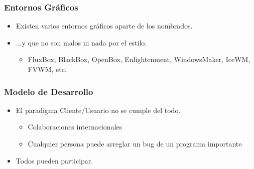 \frame
{
\frametitle{Entornos Gráficos}
\begin{itemize}
	\item Existen varios entornos gráficos aparte de los nombrados.
	\item ...y que no son malos ni nada por el estilo.
	\begin{itemize}
		\item FluxBox, BlackBox, OpenBox, Enlightenment, WindowsMaker, IceWM, FVWM, etc.
	\end{itemize}
\end{itemize}
}

\frame
{
\frametitle{Modelo de Desarrollo}
\begin{itemize}
	\item El paradigma Cliente/Usuario no se cumple del todo.
	\begin{itemize}
		\item Colaboraciones internacionales
		\item Cualquier persona puede arreglar un bug de un programa importante
	\end{itemize}
	\item Todos pueden participar.
\end{itemize}
}


